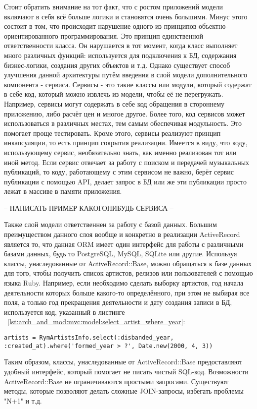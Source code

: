 Стоит обратить внимание на тот факт, что с ростом приложений модели включают в себя всё больше логики и становятся очень большими. Минус этого состоит в том, что происходит нарушение одного из принципов объектно-ориентированного программирования. Это принцип единственной ответственности класса. Он нарушается в тот момент, когда класс выполняет много различных функций: используется для подключения к БД, содержания бизнес-логики, создания других объектов и т.д. Однако существует способ улучшения данной архитектуры путём введения в слой модели дополнительного компонента - сервиса. Сервисы - это такие классы или модули, который содержат в себе код, который можно извлечь из модели, чтобы её не перегружать. Например, сервисы могут содержать в себе код обращения в стороннему приложению, либо расчёт цен и многое другое. Более того, код сервисов может использоваться в различных местах, тем самым обеспечивая модульность. Это помогает проще тестировать. Кроме этого, сервисы реализуют принцип инкапсуляции, то есть принцип сокрытия реализации. Имеется в виду, что коду, использующему сервис, необязательно знать, как именно реализован тот или иной метод. Если сервис отвечает за работу с поиском и передачей музыкальных публикаций, то коду, работающему с этим сервисом не важно, берёт сервис публикации с помощью API, делает запрос в БД или же эти публикации просто лежат в массиве в памяти приложения.

-- НАПИСАТЬ ПРИМЕР КАКОГО\-НИБУДЬ СЕРВИСА --

Также слой модели ответственнен за работу с базой данных. Большим преимуществом данного слоя вообще и конкретно в реализации ActiveRecord является то, что данная ORM имеет один интерфейс для работы с различными базами данных, будь то PostgreSQL, MySQL, SQLite или другие. Используя классы, унаследованные от ActiveRecord::Base, можно обращаться к базе данных для того, чтобы получить список артистов, релизов или пользователей с помощью языка Ruby. Например, если необходимо сделать выборку артистов, год начала деятельности которых больше какого-то определённого, при этом не выбирая все поля, а только год прекращения деятельности и дату создания записи в БД, используется код, указанный в листинге ~\ref{lst:arch_and_mod:mvc:model:select_artist_where_year}:

\begin{lstlisting}[style=fsharpstyle,caption={Пример получения артистов по определённым параметрам}, label=lst:arch_and_mod:mvc:model:select_artist_where_year]
  artists = RymArtistsInfo.select(:disbanded_year, :created_at).where('formed_year > ?', Date.new(2000, 4, 3))
\end{lstlisting}

Таким образом, классы, унаследованные от ActiveRecord::Base предоставляют удобный интерфейс, который помогает не писать чистый SQL-код. Возможности ActiveRecord::Base не ограничиваются простыми запросами. Существуют методы, которые позволяют делать сложные JOIN-запросы, избегать проблемы "N+1" и т.д.
